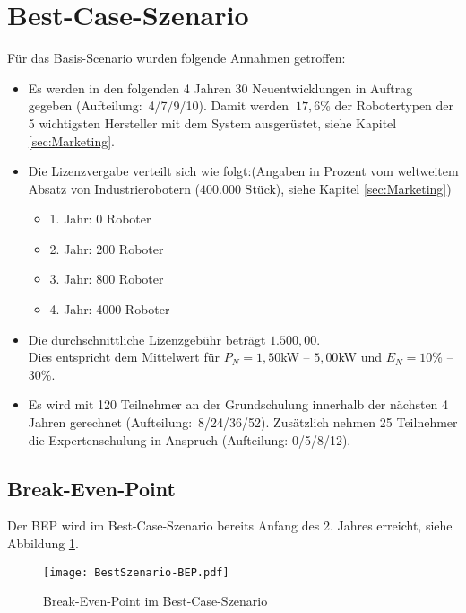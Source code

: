 \section{Best-Case-Szenario}
Für das Basis-Scenario wurden folgende Annahmen getroffen:
\begin{itemize}
	\item Es werden in den folgenden 4 Jahren 30 Neuentwicklungen in Auftrag gegeben (Aufteilung:~4/7/9/10). Damit werden $~17,6$\% der Robotertypen der 5 wichtigsten Hersteller mit dem System ausgerüstet, siehe Kapitel \ref{sec:Marketing}.
	\item Die Lizenzvergabe verteilt sich wie folgt:\newline (Angaben in Prozent vom weltweitem Absatz von Industrierobotern ($400.000$ Stück), siehe Kapitel \ref{sec:Marketing})
	\begin{itemize}
		\item 1. Jahr: 0 Roboter
		\item 2. Jahr: 200 Roboter
		\item 3. Jahr: 800 Roboter
		\item 4. Jahr: 4000 Roboter
	\end{itemize}
	\item Die durchschnittliche Lizenzgebühr beträgt $1.500,00$\officialeuro.\\ Dies entspricht dem Mittelwert für $P_N = 1,50$kW -- $5,00$kW und $E_N = 10$\% -- $30$\%.
	\item Es wird mit 120 Teilnehmer an der Grundschulung innerhalb der nächsten 4 Jahren gerechnet (Aufteilung:~8/24/36/52). Zusätzlich nehmen 25 Teilnehmer die Expertenschulung in Anspruch (Aufteilung: 0/5/8/12).
\end{itemize}

\subsection{Break-Even-Point}
Der BEP wird im Best-Case-Szenario bereits Anfang des 2. Jahres erreicht, siehe Abbildung \ref{fig:BestSzenario-BEP}.
\begin{figure}[h]
	\centering
	\texttt{[image: BestSzenario-BEP.pdf]}
	\caption{Break-Even-Point im Best-Case-Szenario}
	\label{fig:BestSzenario-BEP}
\end{figure}

